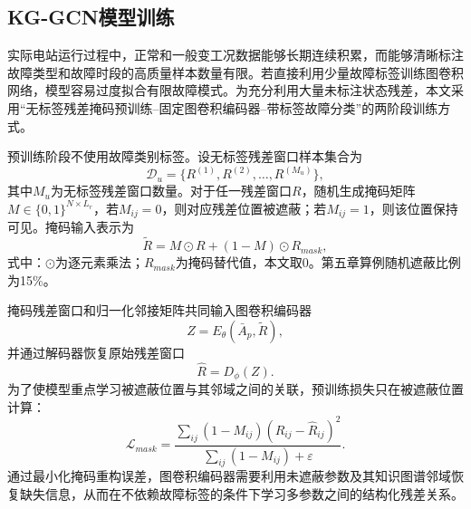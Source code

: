 
\subsection{KG-GCN模型训练}
\label{subsec:kg_training_v5}

实际电站运行过程中，正常和一般变工况数据能够长期连续积累，而能够清晰标注故障类型和故障时段的高质量样本数量有限。若直接利用少量故障标签训练图卷积网络，模型容易过度拟合有限故障模式。为充分利用大量未标注状态残差，本文采用“无标签残差掩码预训练--固定图卷积编码器--带标签故障分类”的两阶段训练方式\cite{YangHaodong2026CFB}。

预训练阶段不使用故障类别标签。设无标签残差窗口样本集合为
\begin{equation}
\mathcal D_u=\{R^{(1)},R^{(2)},\ldots,R^{(M_u)}\},
\end{equation}
其中$M_u$为无标签残差窗口数量。对于任一残差窗口$R$，随机生成掩码矩阵$M\in\{0,1\}^{N\times L_r}$，若$M_{ij}=0$，则对应残差位置被遮蔽；若$M_{ij}=1$，则该位置保持可见。掩码输入表示为
\begin{equation}
\tilde R=M\odot R+(1-M)\odot R_{mask},
\end{equation}
式中：$\odot$为逐元素乘法；$R_{mask}$为掩码替代值，本文取0。第五章算例随机遮蔽比例为15\%。

掩码残差窗口和归一化邻接矩阵共同输入图卷积编码器
\begin{equation}
Z=E_{\theta}(\bar A_p,\tilde R),
\end{equation}
并通过解码器恢复原始残差窗口
\begin{equation}
\hat R=D_{\phi}(Z) .
\end{equation}
为了使模型重点学习被遮蔽位置与其邻域之间的关联，预训练损失只在被遮蔽位置计算：
\begin{equation}
\mathcal L_{mask}=\frac{\sum_{ij}(1-M_{ij})(R_{ij}-\hat R_{ij})^2}{\sum_{ij}(1-M_{ij})+\varepsilon} .
\end{equation}
通过最小化掩码重构误差，图卷积编码器需要利用未遮蔽参数及其知识图谱邻域恢复缺失信息，从而在不依赖故障标签的条件下学习多参数之间的结构化残差关系。

